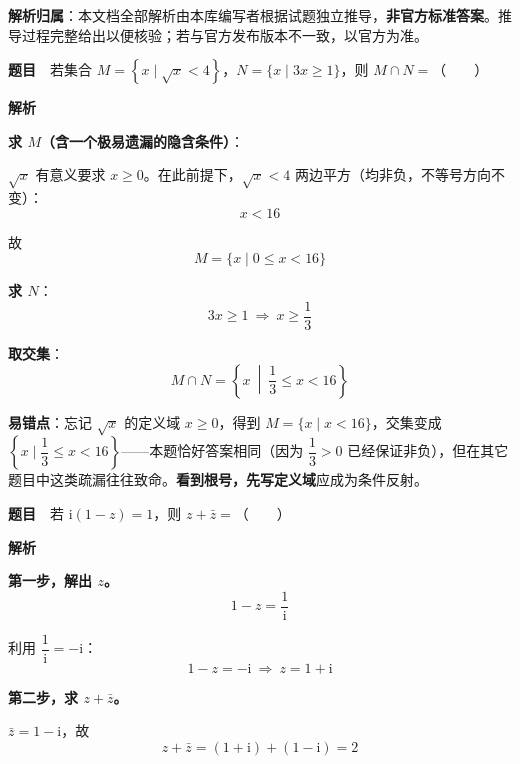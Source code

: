 

\begin{gknotice}
\textbf{解析归属}：本文档全部解析由本库编写者根据试题独立推导，\textbf{非官方标准答案}。推导过程完整给出以便核验；若与官方发布版本不一致，以官方为准。
\end{gknotice}

\par\medskip



\textbf{题目}　若集合 $M=\left\{x\mid\sqrt x<4\right\}$，$N=\{x\mid3x\ge1\}$，则 $M\cap N=$（　　）

\textbf{解析}

\textbf{求 $M$（含一个极易遗漏的隐含条件）}：

$\sqrt x$ 有意义要求 $x\ge0$。在此前提下，$\sqrt x<4$ 两边平方（均非负，不等号方向不变）：
\[x<16\]

故
\[M=\{x\mid0\le x<16\}\]

\textbf{求 $N$}：
\[3x\ge1\ \Longrightarrow\ x\ge\frac13\]

\textbf{取交集}：
\[M\cap N=\left\{x\ \middle|\ \frac13\le x<16\right\}\]


\begin{gktip}
\textbf{易错点}：忘记 $\sqrt x$ 的定义域 $x\ge0$，得到 $M=\{x\mid x<16\}$，交集变成 $\left\{x\mid\dfrac13\le x<16\right\}$——本题恰好答案相同（因为 $\dfrac13>0$ 已经保证非负），但在其它题目中这类疏漏往往致命。\textbf{看到根号，先写定义域}应成为条件反射。
\end{gktip}

\par\medskip


\textbf{题目}　若 $\mathrm i(1-z)=1$，则 $z+\bar z=$（　　）

\textbf{解析}

\textbf{第一步，解出 $z$。}
\[1-z=\frac1{\mathrm i}\]

利用 $\dfrac1{\mathrm i}=-\mathrm i$：
\[1-z=-\mathrm i\ \Longrightarrow\ z=1+\mathrm i\]

\textbf{第二步，求 $z+\bar z$。}

$\bar z=1-\mathrm i$，故
\[z+\bar z=(1+\mathrm i)+(1-\mathrm i)=2\]


